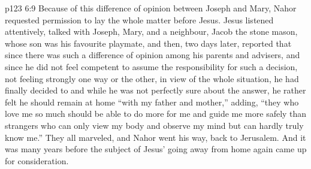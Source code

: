 \vs p123 6:9 Because of this difference of opinion between Joseph and Mary, Nahor requested permission to lay the whole matter before Jesus. Jesus listened attentively, talked with Joseph, Mary, and a neighbour, Jacob the stone mason, whose son was his favourite playmate, and then, two days later, reported that since there was such a difference of opinion among his parents and advisers, and since he did not feel competent to assume the responsibility for such a decision, not feeling strongly one way or the other, in view of the whole situation, he had finally decided to  and while he was not perfectly sure about the answer, he rather felt he should remain at home “with my father and mother,” adding, “they who love me so much should be able to do more for me and guide me more safely than strangers who can only view my body and observe my mind but can hardly truly know me.” They all marveled, and Nahor went his way, back to Jerusalem. And it was many years before the subject of Jesus’ going away from home again came up for consideration.
\quizlink
